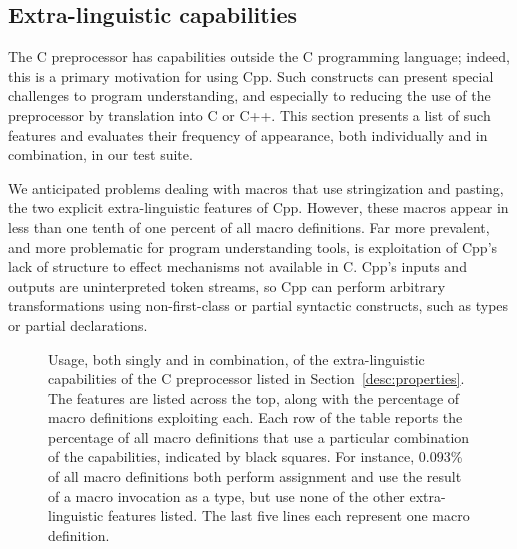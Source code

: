 \documentclass[10pt]{article}
\newcommand{\captionsmall}[1]{\caption[]{\small #1}}
\begin{document}





\subsection{Extra-linguistic capabilities}
\label{sec:extra-linguistic}

The C preprocessor has capabilities outside the C programming language;
indeed, this is a primary motivation for using Cpp.  Such constructs can
present special challenges to program understanding, and especially to
reducing the use of the preprocessor by translation into C or C++.  This
section
presents a list of such features and evaluates their frequency of
appearance, both individually and in combination, in our test suite.

We anticipated problems dealing with macros that use stringization and
pasting, the two explicit extra-linguistic features of Cpp.  However, these
macros appear in less than one tenth of one percent of all macro
definitions.  Far more prevalent, and more problematic for program
understanding tools, is exploitation of Cpp's lack of structure to effect
mechanisms not available in C\@.  Cpp's inputs and outputs are
uninterpreted token streams, so Cpp can perform arbitrary transformations
using non-first-class or partial syntactic constructs, such as types or
partial declarations.

\begin{figure}
  {\small\centerline{}}
  
  \captionsmall{Usage, both singly and in
    combination, of the extra-linguistic capabilities of the C
    preprocessor listed in Section~\ref{desc:properties}.  The features are
    listed across the top, along with the percentage of macro definitions
    exploiting each.  Each row of the table reports the percentage of all
    macro definitions that use a particular combination of the
    capabilities, indicated by black squares.  For instance, 0.093\% of all
    macro definitions both perform assignment and use the result of a macro
    invocation as a type, but use none of the other extra-linguistic
    features listed.  The last five lines each represent one macro
    definition.}
  \label{fig:subset-properties}
\end{figure}
\end{document}
